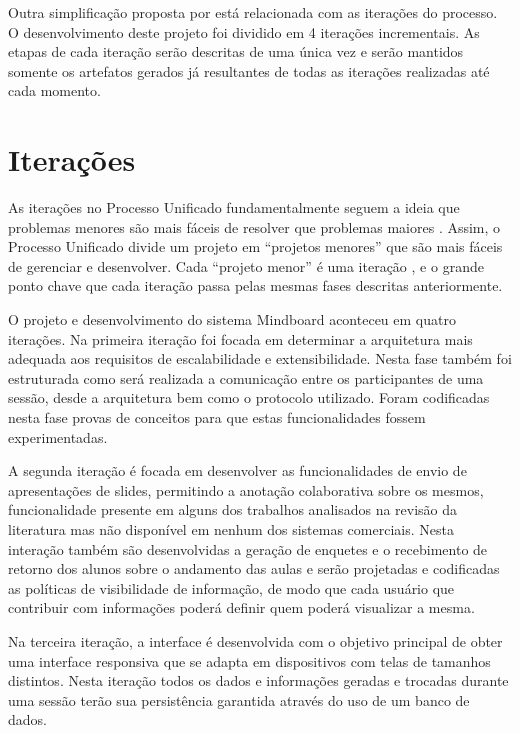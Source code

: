Outra simplificação proposta por  está relacionada com as iterações do processo. O desenvolvimento deste projeto foi dividido em 4 iterações incrementais. As etapas de cada iteração serão descritas de uma única vez e serão mantidos somente os artefatos gerados já resultantes de todas as iterações realizadas até cada momento.


\section{Iterações}

As iterações no Processo Unificado fundamentalmente seguem a ideia que problemas menores são mais fáceis de resolver que problemas maiores \cite{arlow:2002}. Assim, o Processo Unificado divide um projeto em ``projetos menores'' que são mais fáceis de gerenciar e desenvolver. Cada ``projeto menor'' é uma iteração \cite{arlow:2002}, e o grande ponto chave que cada iteração passa pelas mesmas fases descritas anteriormente.


O projeto e desenvolvimento do sistema Mindboard aconteceu em quatro iterações. Na primeira iteração foi focada em determinar a arquitetura mais adequada aos requisitos de escalabilidade e extensibilidade. Nesta fase também foi estruturada como será realizada a comunicação entre os participantes de uma sessão, desde a arquitetura bem como o protocolo utilizado. Foram codificadas nesta fase provas de conceitos para que estas funcionalidades fossem experimentadas.

A segunda iteração é focada em desenvolver as funcionalidades de envio de apresentações de slides, permitindo a anotação colaborativa sobre os mesmos, funcionalidade presente em alguns dos trabalhos analisados na revisão da literatura mas não disponível em nenhum dos sistemas comerciais. Nesta interação também são desenvolvidas a geração de enquetes e o recebimento de retorno dos alunos sobre o andamento das aulas e serão projetadas e codificadas as políticas de visibilidade de informação, de modo que cada usuário que contribuir com informações poderá definir quem poderá visualizar a mesma.

Na terceira iteração, a interface é desenvolvida com o objetivo principal de obter uma interface responsiva que se adapta em dispositivos com telas de tamanhos distintos. Nesta iteração todos os dados e informações geradas e trocadas durante uma sessão terão sua persistência garantida através do uso de um banco de dados.

